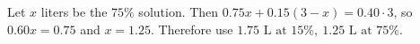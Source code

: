 Let $x$ liters be the $75\%$ solution. Then $0.75x+0.15(3-x)=0.40\cdot3$, so $0.60x=0.75$ and $x=1.25$. Therefore use $\boxed{1.75\text{ L at }15\%,\ 1.25\text{ L at }75\%}$.
